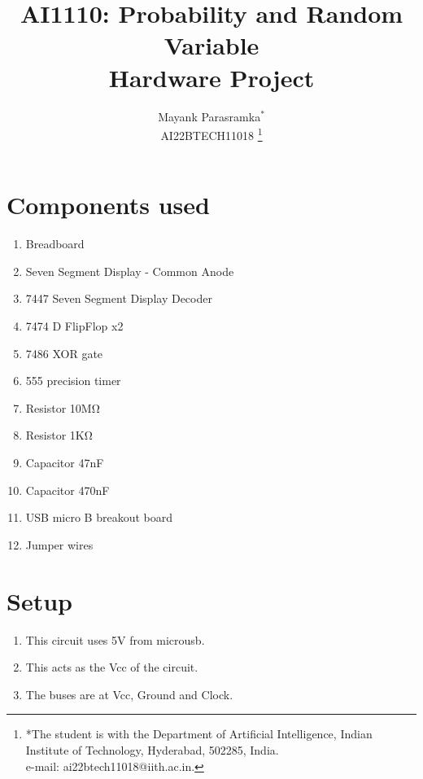 \documentclass[journal,12pt,twocolumn]{IEEEtran}
\begin{document}
\title{
\textbf{AI1110:} Probability and Random Variable\\
Hardware Project
}
\author{Mayank Parasramka$^{*}$\\AI22BTECH11018%
	\thanks{*The student is with the Department
		of Artificial Intelligence, Indian Institute of Technology, Hyderabad,
		502285, India.\\ e-mail: ai22btech11018@iith.ac.in.}
	
}

\newpage
\bigskip
\renewcommand{\thefigure}{\theenumi}
\renewcommand{\thetable}{\theenumi}

\raggedright{}
\tableofcontents
\section{Components used}	
\begin{enumerate}[label=(\roman*)]
\item Breadboard
\item Seven Segment Display - Common Anode
\item 7447 Seven Segment Display Decoder
\item 7474 D FlipFlop x2
\item 7486 XOR gate
\item 555 precision timer
\item Resistor 10MΩ
\item Resistor 1KΩ
\item Capacitor 47nF
\item Capacitor 470nF
\item USB micro B breakout board
\item Jumper wires
\end{enumerate}
\section{Setup}
\begin{enumerate}
\item This circuit uses 5V from microusb.
\item This acts as the Vcc of the circuit.
\item The buses are at Vcc, Ground and Clock.
\end{enumerate}
\end{document}
